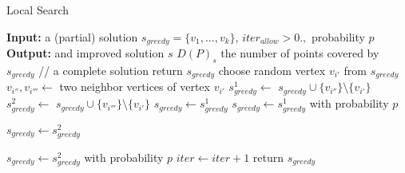 \documentclass[runningheads,a4paper]{llncs}
\begin{document}
       \begin{algorithm}[!t]
      	\caption{Local Search}\label{alg:local-search}
      	\begin{algorithmic}[1]
      		\State \textbf{Input:} a (partial) solution $s_{greedy}=\{v_1,...,v_k\}$, $iter_{allow}>0., $ probability $p$
      		\State \textbf{Output:} and improved solution $s$
      		     \State $D(P)_s$ the number of points covered by $s_{greedy}$
      		       // a complete solution
      		          \State return $s_{greedy}$
      		      \EndIf
      		     \State choose random vertex $v_{i'}$ from $s_{greedy}$
      		     \State $v_{i''},v_{i'''} \gets$ two neighbor vertices of vertex  $v_{i'}$
      		     \State $s^1_{greedy} \gets$ $s_{greedy} \cup \{v_{i''} \} \setminus \{v_{i'}\}$
                 \State $s^2_{greedy} \gets$ $s_{greedy} \cup \{v_{i'''} \} \setminus \{v_{i'}\}$
                        \State $s_{greedy} \gets s^1_{greedy}$
      \EndIf
                        \State $s_{greedy} \gets s^1_{greedy}$ with probability $p$

      		      \EndIf
                        \State $s_{greedy} \gets s^2_{greedy}$
      		      \EndIf

                        \State $s_{greedy} \gets s^2_{greedy}$ with probability $p$
                    \EndIf
      		     \State $iter \gets iter +1 $
      		\EndWhile
      		 \State return $s_{greedy}$
      	\end{algorithmic}
      \end{algorithm}
    \begin{comment}
    
     \subsection{Beam Search (BS)}
        Beam Searxh is an incomplete BFS heuristic search algorithm. At each level of the search, the best $\beta>0$ nodes i kept in the structure called \emph{beam} $B$. all nodes are then expanded in all possible ways. Among the expansions, again, $\beta$ bst nodes is taken for the beam of the next level. 
        The search is processed in the same manner until $B$ is empty. The main question concerns of the criterion of choosing the nodes for a beam. This is done by means of a heuristic evaluation of the nodes. The heuristic is a problem-specific aspect of each problem that is considered for solving. \fxnote{work in progress...}
    \end{comment}   
\end{document}
